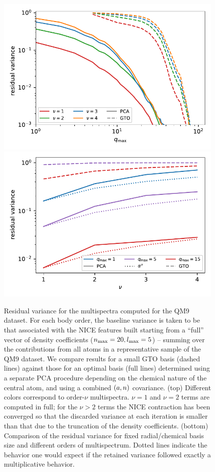 \begin{figure}[tbp]
    \centering
        \includegraphics[width=0.7\linewidth]{fig/optbasis/qm9-multispectrum-variance.pdf}
        \includegraphics[width=0.7\linewidth]{fig/optbasis/qm9-multispectrum-nu.pdf}
    \caption{ Residual variance for the multispectra computed for the QM9 dataset. 
    For each body order, the baseline variance is taken to be that associated with the NICE features built starting from a ``full'' vector of density coefficients ($n_\mathrm{max}=20,  l_\mathrm{max}=5$) -- summing over the contributions from all atoms in a representative sample of the QM9 dataset. 
    We compare results for a small GTO basis (dashed lines) against those for an optimal basis (full lines) determined using a separate PCA procedure depending on the chemical nature of the central atom, and using a combined $(a,n)$ covariance. 
(top) Different colors correspond to order-$\nu$ multispectra. $\nu=1$ and $\nu=2$ terms are computed in full; for the $\nu>2$ terms the NICE contraction has been converged so that the discarded variance at each iteration is smaller than that due to the truncation of the density coefficients. (bottom) Comparison of the residual variance for fixed radial/chemical basis size and different orders of multispectrum. Dotted lines indicate the behavior one would expect if the retained variance followed exactly a multiplicative behavior.}
    \label{fig:qm9-multispectrum-variance}
\end{figure}

